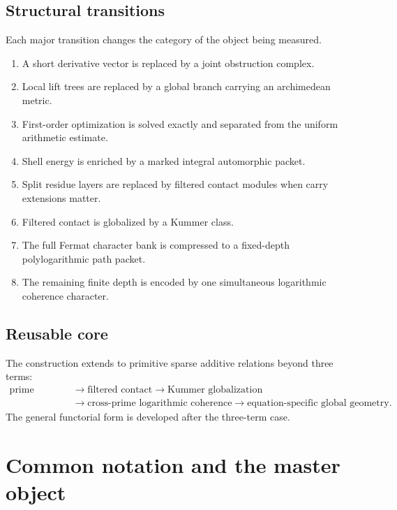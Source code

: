 \section{Structural transitions}
Each major transition changes the category of the object being measured.
\begin{enumerate}[leftmargin=1.5em]
\item A short derivative vector is replaced by a joint obstruction complex.
\item Local lift trees are replaced by a global branch carrying an archimedean metric.
\item First-order optimization is solved exactly and separated from the uniform arithmetic estimate.
\item Shell energy is enriched by a marked integral automorphic packet.
\item Split residue layers are replaced by filtered contact modules when carry extensions matter.
\item Filtered contact is globalized by a Kummer class.
\item The full Fermat character bank is compressed to a fixed-depth polylogarithmic path packet.
\item The remaining finite depth is encoded by one simultaneous logarithmic coherence character.
\end{enumerate}


\section{Reusable core}
The construction extends to primitive sparse additive relations beyond three terms:
\[
\boxed{
\begin{aligned}
\text{prime support}
&\longrightarrow
\text{filtered contact}
\longrightarrow
\text{Kummer globalization}\\
&\longrightarrow
\text{cross-prime logarithmic coherence}
\longrightarrow
\text{equation-specific global geometry}.
\end{aligned}
}
\]
The general functorial form is developed after the three-term case.

\chapter{Common notation and the master object}

